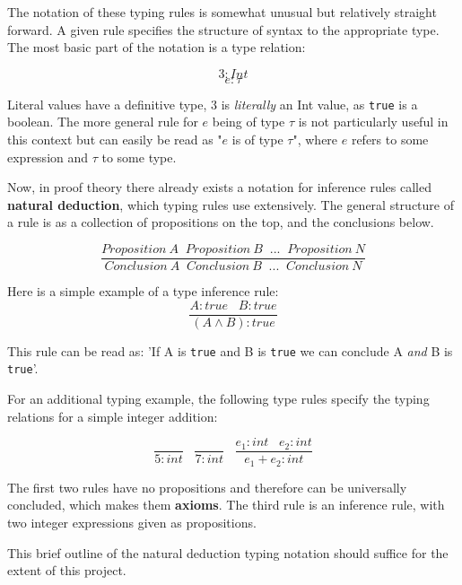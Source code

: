 \documentclass{l4proj}
\begin{document}
The notation of these typing rules is somewhat unusual but relatively straight forward.
A given rule specifies the structure of syntax to the appropriate type.
The most basic part of the notation is a type relation:

\[3 : Int\]
\[e : \tau\]

Literal values have a definitive type, $3$ is \emph{literally} an Int value, as \texttt{true} is a boolean.
The more general rule for $e$ being of type $\tau$ is not particularly useful in this context but can easily be read as "$e$ is of type $\tau$", where $e$ refers to some expression and $\tau$ to some type.

Now, in proof theory there already exists a notation for inference rules called \textbf{natural deduction}, which typing rules use extensively.
The general structure of a rule is as a collection of propositions on the top, and the conclusions below.

\begin{equation} \label{eq:inference-syntax-example}
\frac{Proposition\: A \;\; Proposition\: B \;\; ... \;\; Proposition\: N}{Conclusion\: A \;\; Conclusion\: B \;\; ... \;\; Conclusion\: N}
\end{equation}

Here is a simple example of a type inference rule:
\begin{equation} \label{eq:inference-example}
\frac{A : true \;\;\; B : true}{(A \wedge B) : true}
\end{equation}

This rule can be read as: 'If A is \texttt{true} and B is \texttt{true} we can conclude A \emph{and} B is \texttt{true}'.

For an additional typing example, the following type rules specify the typing relations for a simple integer addition:

\begin{equation} \label{eq:add-type-rule}
\frac{}{5 : int} \;\;\; \frac{}{7 : int} \;\;\; \frac{e_1 : int \;\;\; e_2 : int}{e_1 + e_2 : int}
\end{equation}

The first two rules have no propositions and therefore can be universally concluded, which makes them \textbf{axioms}.
The third rule is an inference rule, with two integer expressions given as propositions.

This brief outline of the natural deduction typing notation should suffice for the extent of this project. 

\end{document}
